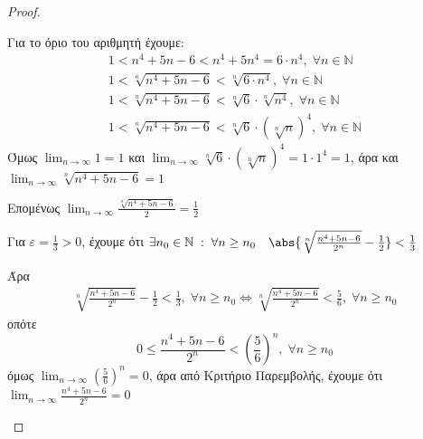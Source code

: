 \begin{enumerate}
\begin{enumerate}[i)]
\begin{proof}
\begin{description}
                    Για το όριο του αριθμητή έχουμε:
                    \begin{gather*}
                        1<n^{4}+5n-6<n^{4}+5n^{4}=6\cdot n^{4}, \; 
                        \forall n \in \mathbb{N} \\
                        1 < \sqrt[n]{n^{4}+5n-6} < \sqrt[n]{6\cdot n^{4}}, \; 
                        \forall n \in \mathbb{N} \\
                        1 < \sqrt[n]{n^{4}+5n-6} < \sqrt[n]{6} \cdot \sqrt[n]{n^{4}}, 
                        \; \forall n \in \mathbb{N} \\
                        1 < \sqrt[n]{n^{4}+5n-6} < \sqrt[n]{6} \cdot (\sqrt[n]{n})^{4},
                        \; \forall n \in \mathbb{N}
                    \end{gather*} 
                    Όμως $ \lim_{n \to \infty} 1 = 1 $ και $ \lim_{n \to \infty} 
                    \sqrt[n]{6} \cdot (\sqrt[n]{n} )^{4} = 1 \cdot 1^{4} =1 $, άρα 
                    και $ \lim_{n \to \infty} \sqrt[n]{n^{4}+5n-6} = 1 $

                    Επομένως $ \lim_{n \to \infty} \frac{\sqrt[n]{n^{4}+5n-6}}{2} = 
                    \frac{1}{2} $

                    Για $ \varepsilon = \frac{1}{3} >0 $, έχουμε ότι 
                    $ \exists n_{0} \in \mathbb{N} \; : \; \forall n \geq n_{0} 
                    \quad \abs{\sqrt[n]{\frac{n^{4}+5n-6}{2^{n}}} - \frac{1}{2}} < 
                    \frac{1}{3} $

                    Άρα 
                    \begin{gather*}
                        \sqrt[n]{\frac{n^{4}+5n-6}{2^{n}}} - \frac{1}{2} < 
                        \frac{1}{3}, \; \forall n \geq n_{0} \Leftrightarrow  
                        \sqrt[n]{\frac{n^{4}+5n-6}{2^{n}}} < \frac{5}{6}, \;
                        \forall n \geq n_{0} 
                    \end{gather*}
                        οπότε 
                        \[
                            0 \leq \frac{n^{4}+5n-6}{2^{n}} < 
                            \left(\frac{5}{6} \right)^{n}, \; \forall n \geq n_{0} 
                         \] 
                         όμως $ \lim_{n \to \infty} (\frac{5}{6} )^{n} = 0 $, άρα 
                         από Κριτήριο Παρεμβολής, έχουμε ότι 
                         $ \lim_{n \to \infty} \frac{n^{4}+5n-6}{2^{n}} = 0 $
             \end{description}
        \end{proof}

        \end{enumerate}
\end{enumerate}






